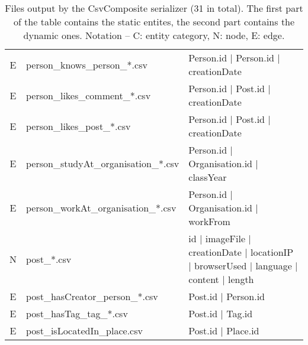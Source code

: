 \begin{table}[htb]
\begin{tabular}{|c|l|l|}
        E                    & person\_knows\_person\_*.csv            & Person.id | Person.id | creationDate                                                                       \\
        E                    & person\_likes\_comment\_*.csv           & Person.id | Post.id | creationDate                                                                         \\
        E                    & person\_likes\_post\_*.csv              & Person.id | Post.id | creationDate                                                                         \\
        E                    & person\_studyAt\_organisation\_*.csv    & Person.id | Organisation.id | classYear                                                                    \\
        E                    & person\_workAt\_organisation\_*.csv     & Person.id | Organisation.id | workFrom                                                                     \\
        \hline
        N                    & post\_*.csv                             & id | imageFile | creationDate | locationIP | browserUsed | language | content | length                     \\
        E                    & post\_hasCreator\_person\_*.csv         & Post.id | Person.id                                                                                        \\
        E                    & post\_hasTag\_tag\_*.csv                & Post.id | Tag.id                                                                                           \\
        E                    & post\_isLocatedIn\_place.csv            & Post.id | Place.id                                                                                         \\
        \hline
    \end{tabular}
    \caption{Files output by the CsvComposite serializer (31 in total). The first part of the table contains the static entites, the second part contains the dynamic ones. Notation -- C: entity category, N: node, E: edge.}
    \label{table:csv_composite}
\end{table}
